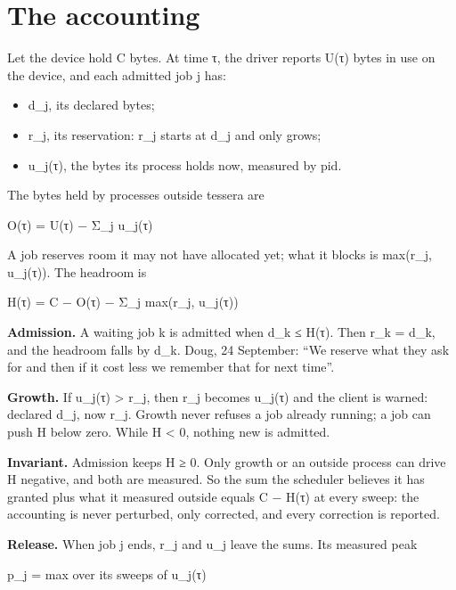 \section{\texorpdfstring{The accounting}{The accounting}}

Let the device hold C bytes. At time τ, the driver reports U(τ) bytes in use on the device, and each admitted job j has:

\begin{itemize}
\item d\_\allowbreak{}j, its declared bytes;
\item r\_\allowbreak{}j, its reservation: r\_\allowbreak{}j starts at d\_\allowbreak{}j and only grows;
\item u\_\allowbreak{}j(τ), the bytes its process holds now, measured by pid.
\end{itemize}

The bytes held by processes outside tessera are

O(τ) = U(τ) − Σ\_\allowbreak{}j u\_\allowbreak{}j(τ)

A job reserves room it may not have allocated yet; what it blocks is max(r\_\allowbreak{}j, u\_\allowbreak{}j(τ)). The headroom is

H(τ) = C − O(τ) − Σ\_\allowbreak{}j max(r\_\allowbreak{}j, u\_\allowbreak{}j(τ))

\textbf{Admission.} A waiting job k is admitted when d\_\allowbreak{}k ≤ H(τ). Then r\_\allowbreak{}k = d\_\allowbreak{}k, and the headroom falls by d\_\allowbreak{}k. Doug, 24 September: “We reserve what they ask for and then if it cost less we remember that for next time”.

\textbf{Growth.} If u\_\allowbreak{}j(τ) > r\_\allowbreak{}j, then r\_\allowbreak{}j becomes u\_\allowbreak{}j(τ) and the client is warned: declared d\_\allowbreak{}j, now r\_\allowbreak{}j. Growth never refuses a job already running; a job can push H below zero. While H < 0, nothing new is admitted.

\textbf{Invariant.} Admission keeps H ≥ 0. Only growth or an outside process can drive H negative, and both are measured. So the sum the scheduler believes it has granted plus what it measured outside equals C − H(τ) at every sweep: the accounting is never perturbed, only corrected, and every correction is reported.

\textbf{Release.} When job j ends, r\_\allowbreak{}j and u\_\allowbreak{}j leave the sums. Its measured peak

p\_\allowbreak{}j = max over its sweeps of u\_\allowbreak{}j(τ)

